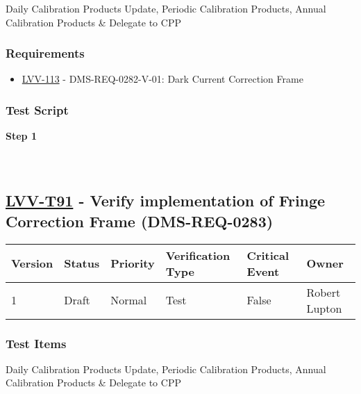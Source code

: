 Daily Calibration Products Update, Periodic Calibration Products, Annual
Calibration Products \& Delegate to CPP

\hypertarget{requirements-180}{%
\subsubsection{Requirements}\label{requirements-180}}

\begin{itemize}
\tightlist
\item
  \href{https://jira.lsstcorp.org/browse/LVV-113}{LVV-113} -
  DMS-REQ-0282-V-01: Dark Current Correction Frame
\end{itemize}

\hypertarget{test-script-180}{%
\subsubsection{Test Script}\label{test-script-180}}

\textbf{Step 1}\\
~\\
~\\

\hypertarget{lvv-t91---verify-implementation-of-fringe-correction-frame-dms-req-0283}{%
\subsection{\texorpdfstring{\href{https://jira.lsstcorp.org/secure/Tests.jspa\#/testCase/LVV-T91}{LVV-T91}
- Verify implementation of Fringe Correction Frame
(DMS-REQ-0283)}{LVV-T91 - Verify implementation of Fringe Correction Frame (DMS-REQ-0283)}}\label{lvv-t91---verify-implementation-of-fringe-correction-frame-dms-req-0283}}

\begin{longtable}[]{@{}llllll@{}}
\toprule
Version & Status & Priority & Verification Type & Critical Event &
Owner\tabularnewline
\midrule
\endhead
1 & Draft & Normal & Test & False & Robert Lupton\tabularnewline
\bottomrule
\end{longtable}

\hypertarget{test-items-180}{%
\subsubsection{Test Items}\label{test-items-180}}

Daily Calibration Products Update, Periodic Calibration Products, Annual
Calibration Products \& Delegate to CPP

